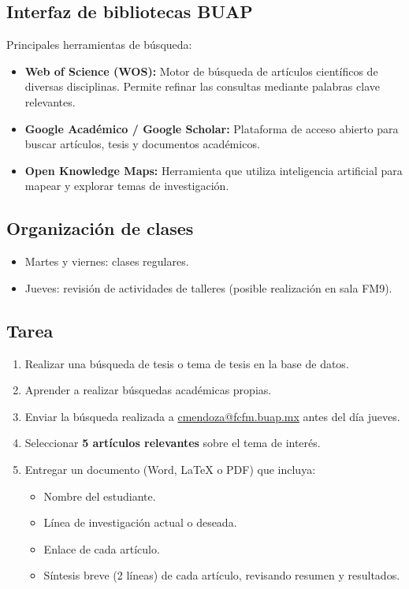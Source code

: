 \documentclass{article}
\begin{document}
\subsection{Interfaz de bibliotecas BUAP} \vspace{0.5cm}

Principales herramientas de búsqueda:
\begin{itemize}
	\item \textbf{Web of Science (WOS):} Motor de búsqueda de artículos científicos de diversas disciplinas. Permite refinar las consultas mediante palabras clave relevantes.
	\item \textbf{Google Académico / Google Scholar:} Plataforma de acceso abierto para buscar artículos, tesis y documentos académicos.
	\item \textbf{Open Knowledge Maps:} Herramienta que utiliza inteligencia artificial para mapear y explorar temas de investigación.
\end{itemize}

\subsection{Organización de clases} \vspace{0.5cm}
\begin{itemize}
	\item Martes y viernes: clases regulares.
	\item Jueves: revisión de actividades de talleres (posible realización en sala FM9).
\end{itemize}

\subsection{Tarea} \vspace{0.5cm}

\begin{enumerate}
	\item Realizar una búsqueda de tesis o tema de tesis en la base de datos.
	\item Aprender a realizar búsquedas académicas propias.
	\item Enviar la búsqueda realizada a \href{mailto:cmendoza@fcfm.buap.mx}{cmendoza@fcfm.buap.mx} antes del día jueves.
	\item Seleccionar \textbf{5 artículos relevantes} sobre el tema de interés.
	\item Entregar un documento (Word, LaTeX o PDF) que incluya:
	\begin{itemize}
		\item Nombre del estudiante.
		\item Línea de investigación actual o deseada.
		\item Enlace de cada artículo.
		\item Síntesis breve (2 líneas) de cada artículo, revisando resumen y resultados.
	\end{itemize}
\end{enumerate}
\end{document}
